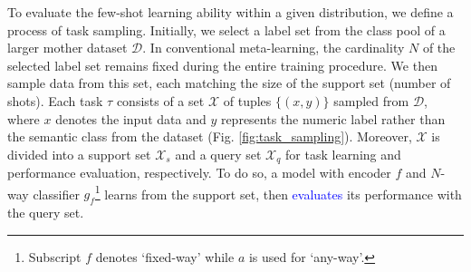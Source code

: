 \documentclass[letterpaper]{article} %
\newcommand{\jh}[1]{\textcolor{blue}{#1}}
\newcommand{\yr}[1]{\textcolor{magenta}{#1}}
\begin{document}
To evaluate the few-shot learning ability within a given distribution, we define a process of task sampling. Initially, 
we select a label set from the class pool of a larger mother dataset  $\mathcal{D}$. In conventional meta-learning, the cardinality $N$ of the selected label set remains
fixed during the entire training procedure. We then sample data from this set, each matching the size of the support set (number of shots).
Each task $\tau$ consists of a set $\mathcal{X}$ of tuples $\{(x,y)\}$ sampled from $\mathcal{D}$, where $x$ denotes the input data and $y$ represents the numeric label rather than the semantic class from the dataset (Fig. \ref{fig:task_sampling}).  Moreover, $\mathcal{X}$ is divided into a support set $\mathcal{X}_s$ and a query set $\mathcal{X}_q$ for task learning and performance evaluation, respectively. %
To do so, a model with encoder $f$ and $N$-way classifier $g_{f}$\footnote{Subscript $f$ denotes `fixed-way' while $a$ is used for `any-way'. } learns from the support set, then \jh{evaluates} its performance with the query set.
\end{document}
